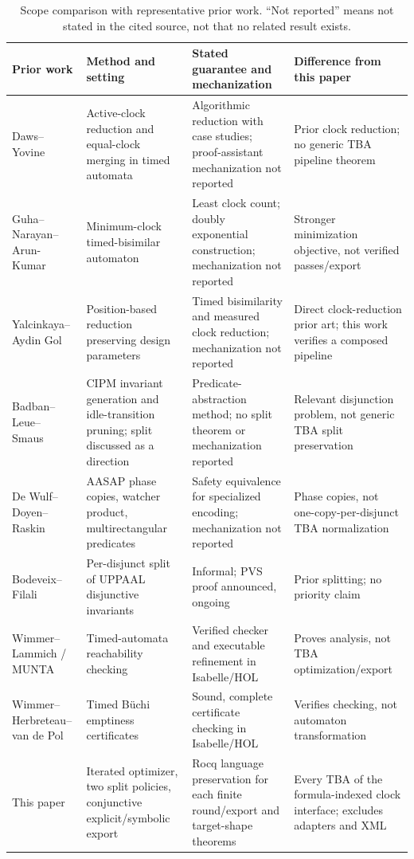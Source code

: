 \begin{table}[t]
\centering
\caption{Scope comparison with representative prior work. “Not reported” means not stated in the cited source, not that no related result exists.}
\label{tab:related-work}
\small
\setlength{\tabcolsep}{3pt}
\begin{tabular}{@{}>{\raggedright\arraybackslash}p{}>{\raggedright\arraybackslash}p{}>{\raggedright\arraybackslash}p{}>{\raggedright\arraybackslash}p{}@{}}
\toprule
Prior work & Method and setting & Stated guarantee and mechanization & Difference from this paper\\
\midrule
Daws--Yovine~\cite{daws_yovine_rtss1996} & Active-clock reduction and equal-clock merging in timed automata & Algorithmic reduction with case studies; proof-assistant mechanization not reported & Prior clock reduction; no generic TBA pipeline theorem\\
Guha--Narayan--Arun-Kumar~\cite{guha_narayan_arunkumar_concur2014} & Minimum-clock timed-bisimilar automaton & Least clock count; doubly exponential construction; mechanization not reported & Stronger minimization objective, not verified passes/export\\
Yalcinkaya--Aydin Gol~\cite{yalcinkaya_aydin_gol_formalise2019} & Position-based reduction preserving design parameters & Timed bisimilarity and measured clock reduction; mechanization not reported & Direct clock-reduction prior art; this work verifies a composed pipeline\\
Badban--Leue--Smaus~\cite{badban_etal_wing2010} & CIPM invariant generation and idle-transition pruning; split discussed as a direction & Predicate-abstraction method; no split theorem or mechanization reported & Relevant disjunction problem, not generic TBA split preservation\\
De Wulf--Doyen--Raskin~\cite{de_wulf_doyen_raskin_fm2005} & AASAP phase copies, watcher product, multirectangular predicates & Safety equivalence for specialized encoding; mechanization not reported & Phase copies, not one-copy-per-disjunct TBA normalization\\
Bodeveix--Filali~\cite{[BF03]} & Per-disjunct split of UPPAAL disjunctive invariants & Informal; PVS proof announced, ongoing & Prior splitting; no priority claim\\
Wimmer--Lammich / MUNTA~\cite{munta_tacas18,munta_formats19} & Timed-automata reachability checking & Verified checker and executable refinement in Isabelle/HOL & Proves analysis, not TBA optimization/export\\
Wimmer--Herbreteau--van de Pol~\cite{wimmer_herbreteau_vandepol_formats2020} & Timed B\"uchi emptiness certificates & Sound, complete certificate checking in Isabelle/HOL & Verifies checking, not automaton transformation\\
This paper & Iterated optimizer, two split policies, conjunctive explicit/symbolic export & Rocq language preservation for each finite round/export and target-shape theorems & Every TBA of the formula-indexed clock interface; excludes adapters and XML\\
\bottomrule
\end{tabular}
\end{table}

